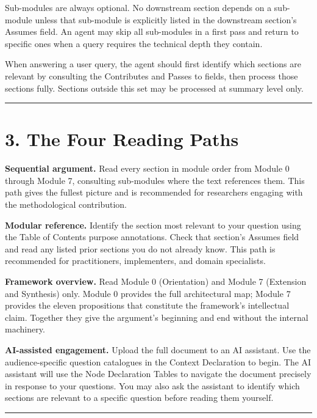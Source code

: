 \documentclass[
  11pt,
  a4paper,
  twoside,
  openright]{scrbook}
\begin{document}
Sub-modules are always optional. No downstream section depends on a
sub-module unless that sub-module is explicitly listed in the downstream
section's Assumes field. An agent may skip all sub-modules in a first
pass and return to specific ones when a query requires the technical
depth they contain.

When answering a user query, the agent should first identify which
sections are relevant by consulting the Contributes and Passes to
fields, then process those sections fully. Sections outside this set may
be processed at summary level only.

\begin{center}\rule{0.5\linewidth}{0.5pt}\end{center}

\section{3. The Four Reading Paths}\label{the-four-reading-paths}

\textbf{Sequential argument.} Read every section in module order from
Module 0 through Module 7, consulting sub-modules where the text
references them. This path gives the fullest picture and is recommended
for researchers engaging with the methodological contribution.

\textbf{Modular reference.} Identify the section most relevant to your
question using the Table of Contents purpose annotations. Check that
section's Assumes field and read any listed prior sections you do not
already know. This path is recommended for practitioners, implementers,
and domain specialists.

\textbf{Framework overview.} Read Module 0 (Orientation) and Module 7
(Extension and Synthesis) only. Module 0 provides the full architectural
map; Module 7 provides the eleven propositions that constitute the
framework's intellectual claim. Together they give the argument's
beginning and end without the internal machinery.

\textbf{AI-assisted engagement.} Upload the full document to an AI
assistant. Use the audience-specific question catalogues in the Context
Declaration to begin. The AI assistant will use the Node Declaration
Tables to navigate the document precisely in response to your questions.
You may also ask the assistant to identify which sections are relevant
to a specific question before reading them yourself.

\begin{center}\rule{0.5\linewidth}{0.5pt}\end{center}
\end{document}
